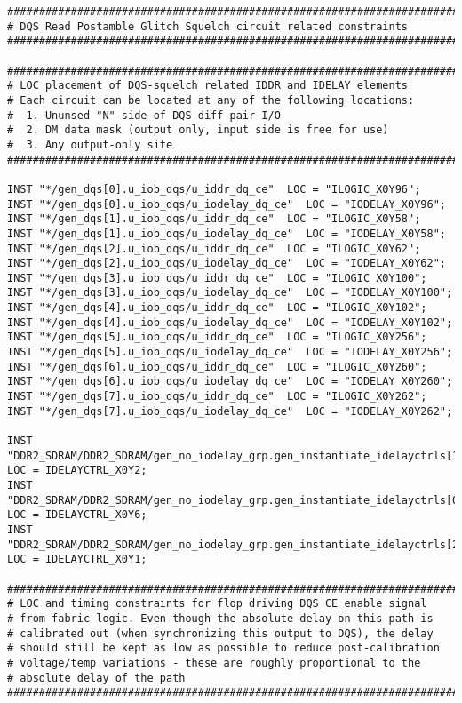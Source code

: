 \begin{verbatim}
###############################################################################
# DQS Read Postamble Glitch Squelch circuit related constraints
###############################################################################

###############################################################################
# LOC placement of DQS-squelch related IDDR and IDELAY elements
# Each circuit can be located at any of the following locations:
#  1. Ununsed "N"-side of DQS diff pair I/O
#  2. DM data mask (output only, input side is free for use)
#  3. Any output-only site
###############################################################################

INST "*/gen_dqs[0].u_iob_dqs/u_iddr_dq_ce"  LOC = "ILOGIC_X0Y96";
INST "*/gen_dqs[0].u_iob_dqs/u_iodelay_dq_ce"  LOC = "IODELAY_X0Y96";
INST "*/gen_dqs[1].u_iob_dqs/u_iddr_dq_ce"  LOC = "ILOGIC_X0Y58";
INST "*/gen_dqs[1].u_iob_dqs/u_iodelay_dq_ce"  LOC = "IODELAY_X0Y58";
INST "*/gen_dqs[2].u_iob_dqs/u_iddr_dq_ce"  LOC = "ILOGIC_X0Y62";
INST "*/gen_dqs[2].u_iob_dqs/u_iodelay_dq_ce"  LOC = "IODELAY_X0Y62";
INST "*/gen_dqs[3].u_iob_dqs/u_iddr_dq_ce"  LOC = "ILOGIC_X0Y100";
INST "*/gen_dqs[3].u_iob_dqs/u_iodelay_dq_ce"  LOC = "IODELAY_X0Y100";
INST "*/gen_dqs[4].u_iob_dqs/u_iddr_dq_ce"  LOC = "ILOGIC_X0Y102";
INST "*/gen_dqs[4].u_iob_dqs/u_iodelay_dq_ce"  LOC = "IODELAY_X0Y102";
INST "*/gen_dqs[5].u_iob_dqs/u_iddr_dq_ce"  LOC = "ILOGIC_X0Y256";
INST "*/gen_dqs[5].u_iob_dqs/u_iodelay_dq_ce"  LOC = "IODELAY_X0Y256";
INST "*/gen_dqs[6].u_iob_dqs/u_iddr_dq_ce"  LOC = "ILOGIC_X0Y260";
INST "*/gen_dqs[6].u_iob_dqs/u_iodelay_dq_ce"  LOC = "IODELAY_X0Y260";
INST "*/gen_dqs[7].u_iob_dqs/u_iddr_dq_ce"  LOC = "ILOGIC_X0Y262";
INST "*/gen_dqs[7].u_iob_dqs/u_iodelay_dq_ce"  LOC = "IODELAY_X0Y262";

INST "DDR2_SDRAM/DDR2_SDRAM/gen_no_iodelay_grp.gen_instantiate_idelayctrls[1].idelayctrl0" LOC = IDELAYCTRL_X0Y2;
INST "DDR2_SDRAM/DDR2_SDRAM/gen_no_iodelay_grp.gen_instantiate_idelayctrls[0].idelayctrl0" LOC = IDELAYCTRL_X0Y6;
INST "DDR2_SDRAM/DDR2_SDRAM/gen_no_iodelay_grp.gen_instantiate_idelayctrls[2].idelayctrl0" LOC = IDELAYCTRL_X0Y1;

###############################################################################
# LOC and timing constraints for flop driving DQS CE enable signal
# from fabric logic. Even though the absolute delay on this path is
# calibrated out (when synchronizing this output to DQS), the delay
# should still be kept as low as possible to reduce post-calibration
# voltage/temp variations - these are roughly proportional to the
# absolute delay of the path
###############################################################################


\end{verbatim}

